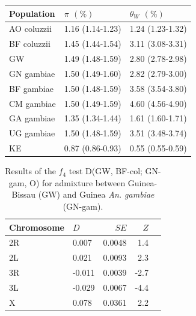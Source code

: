 \begin{refsection}
\begin{table}[h]
\begin{center}
\begin{threeparttable}
\begin{tabular}{lll}
 \hline
 \textbf{Population} & $\pi$ $(\%)$ & $\theta_{W}$  $(\%)$ \\
 \hline
AO coluzzii & 1.16 (1.14-1.23) & 1.24 (1.23-1.32) \\
BF coluzzii & 1.45 (1.44-1.54) & 3.11 (3.08-3.31) \\
GW & 1.49 (1.48-1.59) & 2.80 (2.78-2.98) \\
GN gambiae & 1.50 (1.49-1.60) & 2.82 (2.79-3.00) \\
BF gambiae & 1.50 (1.48-1.59) & 3.58 (3.54-3.80) \\
CM gambiae & 1.50 (1.49-1.59) & 4.60 (4.56-4.90) \\
GA gambiae & 1.35 (1.34-1.44) & 1.61 (1.60-1.71) \\
UG gambiae & 1.50 (1.48-1.59) & 3.51 (3.48-3.74) \\
KE & 0.87 (0.86-0.93) & 0.55 (0.55-0.59) \\
 \hline
\end{tabular}

\end{threeparttable}
\end{center}
\end{table}


\clearpage

\begin{table}[h]
\begin{center}
\begin{threeparttable}

\caption{Results of the $f_4$ test D(GW, BF-col; GN-gam, O) for admixture between Guinea-Bissau (GW) and Guinea \textit{An. gambiae} (GN-gam).
}

\label{table:gwf4}

\begin{tabular}{llrrr}
 \hline
 \textbf{Chromosome} & $D$ & $SE$ & $Z$ \\
 \hline
2R & 0.007 & 0.0048 & 1.4 \\
2L & 0.021 & 0.0093 & 2.3 \\
3R & -0.011 & 0.0039 & -2.7 \\
3L & -0.029 & 0.0067 & -4.4 \\
X & 0.078 & 0.0361 & 2.2 \\
 \hline
\end{tabular}

\end{threeparttable}
\end{center}
\end{table}


\printbibliography[
heading=subbibintoc,
title={References}
]


\end{refsection}
